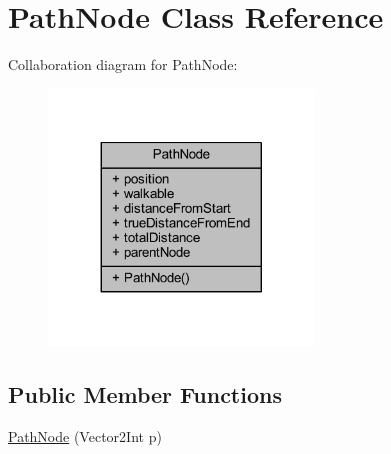 \hypertarget{class_path_node}{}\section{Path\+Node Class Reference}
\label{class_path_node}


Collaboration diagram for Path\+Node\+:
\nopagebreak
\begin{figure}[H]
\begin{center}
\leavevmode
\includegraphics[width=200pt]{class_path_node__coll__graph}
\end{center}
\end{figure}
\subsection*{Public Member Functions}
\begin{DoxyCompactItemize}
\item 
\mbox{\hyperlink{class_path_node_a30a770f5dcef4859cced1063f003c85c}{Path\+Node}} (Vector2\+Int p)
\end{DoxyCompactItemize}
